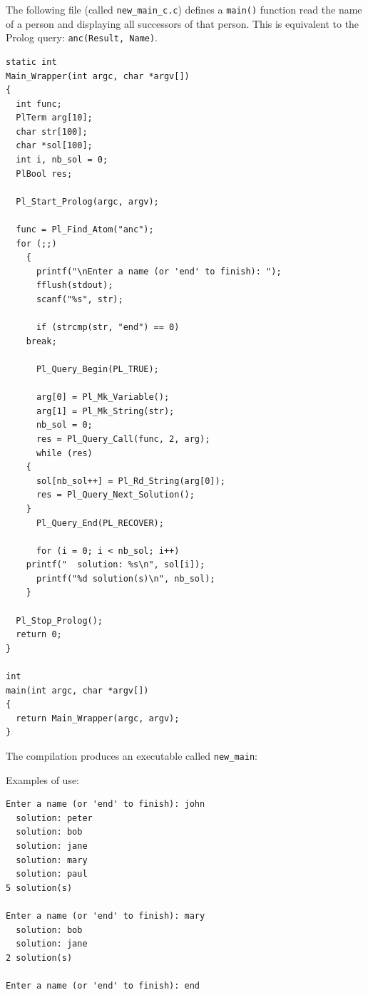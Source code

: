 The following file (called \texttt{new\_main\_c.c}) defines a \texttt{main()}
function read the name of a person and displaying all successors of that
person. This is equivalent to the Prolog query: \texttt{anc(Result, Name)}.

\begin{Code}
\begin{verbatim}
static int
Main_Wrapper(int argc, char *argv[])
{
  int func;
  PlTerm arg[10];
  char str[100];
  char *sol[100];
  int i, nb_sol = 0;
  PlBool res;

  Pl_Start_Prolog(argc, argv);

  func = Pl_Find_Atom("anc");
  for (;;)
    {
      printf("\nEnter a name (or 'end' to finish): ");
      fflush(stdout);
      scanf("%s", str);

      if (strcmp(str, "end") == 0)
	break;

      Pl_Query_Begin(PL_TRUE);

      arg[0] = Pl_Mk_Variable();
      arg[1] = Pl_Mk_String(str);
      nb_sol = 0;
      res = Pl_Query_Call(func, 2, arg);
      while (res)
	{
	  sol[nb_sol++] = Pl_Rd_String(arg[0]);
	  res = Pl_Query_Next_Solution();
	}
      Pl_Query_End(PL_RECOVER);

      for (i = 0; i < nb_sol; i++)
	printf("  solution: %s\n", sol[i]);
      printf("%d solution(s)\n", nb_sol);
    }

  Pl_Stop_Prolog();
  return 0;
}

int
main(int argc, char *argv[])
{
  return Main_Wrapper(argc, argv);
}
\end{verbatim}
\end{Code}

The compilation produces an executable called \texttt{new\_main}:


Examples of use:

\begin{Code}
\begin{verbatim}
Enter a name (or 'end' to finish): john
  solution: peter
  solution: bob
  solution: jane
  solution: mary
  solution: paul
5 solution(s)

Enter a name (or 'end' to finish): mary
  solution: bob
  solution: jane
2 solution(s)

Enter a name (or 'end' to finish): end
\end{verbatim}
\end{Code}

